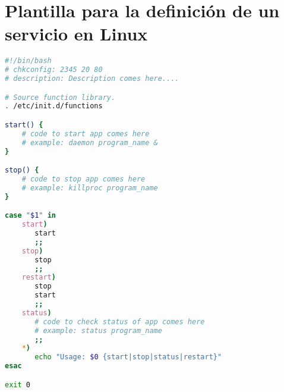 \chapter{Plantilla para la definición de un servicio en Linux} \label{append:init.d}

\begin{lstlisting}[language=bash]
#!/bin/bash
# chkconfig: 2345 20 80
# description: Description comes here....

# Source function library.
. /etc/init.d/functions

start() {
    # code to start app comes here
    # example: daemon program_name &
}

stop() {
    # code to stop app comes here
    # example: killproc program_name
}

case "$1" in
    start)
       start
       ;;
    stop)
       stop
       ;;
    restart)
       stop
       start
       ;;
    status)
       # code to check status of app comes here
       # example: status program_name
       ;;
    *)
       echo "Usage: $0 {start|stop|status|restart}"
esac

exit 0
\end{lstlisting}